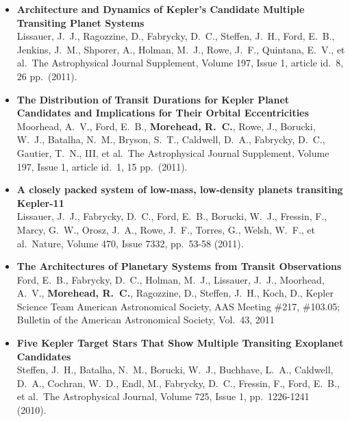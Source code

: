 \documentclass[12pt,letterpaper,sans]{moderncv} %
\begin{document}
\begin{itemize}
 \item \textbf{ Architecture and Dynamics of Kepler's Candidate Multiple 
Transiting Planet Systems } \\ Lissauer, J.~J., Ragozzine, D., Fabrycky, 
D.~C., Steffen, J.~H., Ford, E.~B., Jenkins, J.~M., Shporer, A., Holman, 
M.~J., Rowe, J.~F., Quintana, E.~V., et al.\ The Astrophysical Journal 
Supplement, Volume 197, Issue 1, article id.~8, 26 pp.~(2011).\ \\ 

 \item \textbf{ The Distribution of Transit Durations for Kepler Planet 
Candidates and Implications for Their Orbital Eccentricities } \\ Moorhead, 
A.~V., Ford, E.~B., \textbf{Morehead, R.~C.}, Rowe, J., Borucki, W.~J., Batalha, 
N.~M., Bryson, S.~T., Caldwell, D.~A., Fabrycky, D.~C., Gautier, T.~N., 
III, et al.\ The Astrophysical Journal Supplement, Volume 197, Issue 1, 
article id.~1, 15 pp.~(2011).\ \\ 

 \item \textbf{ A closely packed system of low-mass, low-density planets 
transiting Kepler-11 } \\ Lissauer, J.~J., Fabrycky, D.~C., Ford, E.~B., 
Borucki, W.~J., Fressin, F., Marcy, G.~W., Orosz, J.~A., Rowe, J.~F., 
Torres, G., Welsh, W.~F., et al.\ Nature, Volume 470, Issue 7332, pp.~53-58 
(2011).\ \\ 


 \item \textbf{ The Architectures of Planetary Systems from Transit 
Observations } \\ Ford, E.~B., Fabrycky, D.~C., Holman, M.~J., Lissauer, 
J.~J., Moorhead, A.~V., \textbf{Morehead, R.~C.}, Ragozzine, D., Steffen, J.~H., 
Koch, D., Kepler Science Team American Astronomical Society, AAS Meeting 
\#217, \#103.05; Bulletin of the American Astronomical Society, Vol.~43, 
2011 \\ 

 \item \textbf{ Five Kepler Target Stars That Show Multiple Transiting 
Exoplanet Candidates } \\ Steffen, J.~H., Batalha, N.~M., Borucki, W.~J., 
Buchhave, L.~A., Caldwell, D.~A., Cochran, W.~D., Endl, M., Fabrycky, 
D.~C., Fressin, F., Ford, E.~B., et al.\ The Astrophysical Journal, Volume 
725, Issue 1, pp.~1226-1241 (2010).\ \\ 


\end{itemize}
\end{document}
